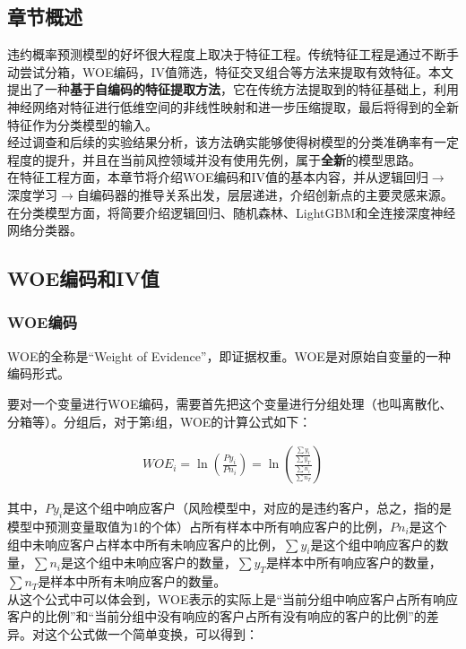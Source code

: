 \subsection{章节概述}
违约概率预测模型的好坏很大程度上取决于特征工程。传统特征工程是通过不断手动尝试分箱，WOE编码，IV值筛选，特征交叉组合等方法来提取有效特征。本文提出了一种\textbf{基于自编码的特征提取方法}，它在传统方法提取到的特征基础上，利用神经网络对特征进行低维空间的非线性映射和进一步压缩提取，最后将得到的全新特征作为分类模型的输入。\\

经过调查和后续的实验结果分析，该方法确实能够使得树模型的分类准确率有一定程度的提升，并且在当前风控领域并没有使用先例，属于\textbf{全新}的模型思路。\\

在特征工程方面，本章节将介绍WOE编码和IV值的基本内容，并从逻辑回归$\rightarrow$深度学习$\rightarrow$自编码器的推导关系出发，层层递进，介绍创新点的主要灵感来源。在分类模型方面，将简要介绍逻辑回归、随机森林、LightGBM和全连接深度神经网络分类器。

\subsection{WOE编码和IV值}

\subsubsection{WOE编码}
WOE的全称是“Weight of Evidence”，即证据权重。WOE是对原始自变量的一种编码形式。

要对一个变量进行WOE编码，需要首先把这个变量进行分组处理（也叫离散化、分箱等）。分组后，对于第i组，WOE的计算公式如下：

\begin{equation}
    \begin{aligned}
        WOE_i = \ln(\frac{Py_i}{Pn_i})=\ln(\frac{\frac{\sum y_i}{\sum y_T}}{\frac{\sum n_i}{\sum n_T}})
    \end{aligned}
\end{equation}

其中，$Py_i$是这个组中响应客户（风险模型中，对应的是违约客户，总之，指的是模型中预测变量取值为1的个体）占所有样本中所有响应客户的比例，$Pn_i$是这个组中未响应客户占样本中所有未响应客户的比例，$\sum y_i$是这个组中响应客户的数量，$\sum n_i$是这个组中未响应客户的数量，$\sum y_T$是样本中所有响应客户的数量，$\sum n_T$是样本中所有未响应客户的数量。\\

从这个公式中可以体会到，WOE表示的实际上是“当前分组中响应客户占所有响应客户的比例”和“当前分组中没有响应的客户占所有没有响应的客户的比例”的差异。对这个公式做一个简单变换，可以得到：

